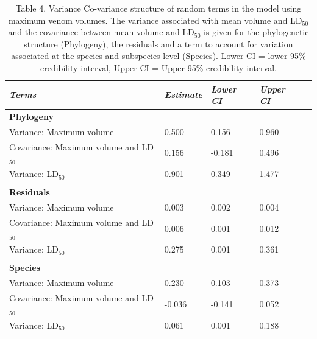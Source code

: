 \begin{table}[H]
  \centering
    \caption[ ]{Table 4. Variance Co-variance structure of random terms in the model using maximum venom volumes. The variance associated with mean volume and LD$_{50}$ and the covariance between mean volume and LD$_{50}$ is given for the phylogenetic structure (Phylogeny), the residuals and a term to account for variation associated at the species and subspecies level (Species). Lower CI = lower 95\% credibility interval, Upper CI = Upper 95\% credibility interval.}
\begin{tabular}{*5l}    \toprule
\emph{Terms} & \emph{Estimate} & \emph{Lower CI} & \emph{Upper CI}\\\midrule
\textbf{Phylogeny} &   &   &  \\ 
Variance: Maximum volume & 0.500 & 0.156 & 0.960 \\
Covariance: Maximum volume and LD$_{50}$ & 0.156  &  -0.181  & 0.496 \\
Variance: LD$_{50}$ & 0.901 & 0.349 & 1.477 \\

 &   &   &  \\

\textbf{Residuals} &   &   &  \\ 
Variance: Maximum volume & 0.003 & 0.002 & 0.004 \\
Covariance: Maximum volume and LD$_{50}$ & 0.006  & 0.001  & 0.012 \\
Variance: LD$_{50}$ & 0.275 & 0.001 & 0.361 \\

 &   &   &  \\ 

\textbf{Species} &   &   &  \\ 
Variance: Maximum volume & 0.230 & 0.103 & 0.373 \\
Covariance: Maximum volume and LD$_{50}$ &  -0.036  &  -0.141  & 0.052 \\
Variance: LD$_{50}$ & 0.061 & 0.001 & 0.188 \\\bottomrule
 \hline
\end{tabular}
  \label{tbl:Table 4.}
\end{table}


